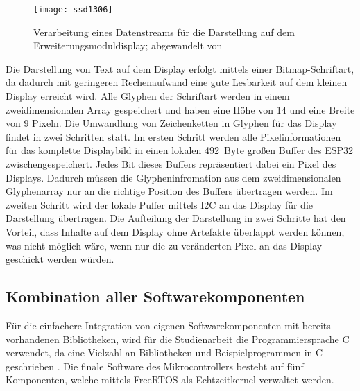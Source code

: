 \begin{figure}[h]
    \centering
    \texttt{[image: ssd1306]}
    \caption{Verarbeitung eines Datenstreams für die Darstellung auf dem Erweiterungsmoduldisplay; abgewandelt von \cite[S.~37]{ssd1306}}
    \label{fig:ssd1306PixelControl}
\end{figure}

Die Darstellung von Text auf dem Display erfolgt mittels einer Bitmap-Schriftart, da dadurch mit geringeren Rechenaufwand eine gute Lesbarkeit auf dem kleinen Display erreicht wird. Alle Glyphen der Schriftart werden in einem zweidimensionalen Array gespeichert und haben eine Höhe von 14 und eine Breite von 9 Pixeln. Die Umwandlung von Zeichenketten in Glyphen für das Display findet in zwei Schritten statt. Im ersten Schritt werden alle Pixelinformationen für das komplette Displaybild in einen lokalen 492~Byte großen Buffer des ESP32 zwischengespeichert. Jedes Bit dieses Buffers repräsentiert dabei ein Pixel des Displays. Dadurch müssen die Glypheninfromation aus dem zweidimensionalen Glyphenarray nur an die richtige Position des Buffers übertragen werden. Im zweiten Schritt wird der lokale Puffer mittels \ac{I2C} an das Display für die Darstellung übertragen. Die Aufteilung der Darstellung in zwei Schritte hat den Vorteil, dass Inhalte auf dem Display ohne Artefakte überlappt werden können, was nicht möglich wäre, wenn nur die zu veränderten Pixel an das Display geschickt werden würden.

\subsection{Kombination aller Softwarekomponenten}

Für die einfachere Integration von eigenen Softwarekomponenten mit bereits vorhandenen Bibliotheken, wird für die Studienarbeit die Programmiersprache C verwendet, da eine Vielzahl an Bibliotheken und Beispielprogrammen in C geschrieben \cite{espressifIDF}. Die finale Software des Mikrocontrollers besteht auf fünf Komponenten, welche mittels FreeRTOS als Echtzeitkernel verwaltet werden. 

